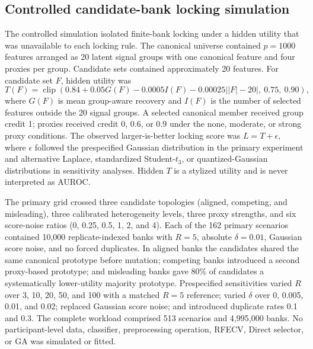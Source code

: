 \subsection{Controlled candidate-bank locking simulation}

The controlled simulation isolated finite-bank locking under a hidden utility that was unavailable to each locking rule. The canonical universe contained $p=1000$ features arranged as 20 latent signal groups with one canonical feature and four proxies per group. Candidate sets contained approximately 20 features. For candidate set $F$, hidden utility was
\begin{equation}
T(F)=\operatorname{clip}\left(0.84+0.05G(F)-0.0005I(F)-0.00025\left||F|-20\right|,\ 0.75,\ 0.90\right),
\end{equation}
where $G(F)$ is mean group-aware recovery and $I(F)$ is the number of selected features outside the 20 signal groups. A selected canonical member received group credit 1; proxies received credit 0, 0.6, or 0.9 under the none, moderate, or strong proxy conditions. The observed larger-is-better locking score was $L=T+\epsilon$, where $\epsilon$ followed the prespecified Gaussian distribution in the primary experiment and alternative Laplace, standardized Student-$t_3$, or quantized-Gaussian distributions in sensitivity analyses. Hidden $T$ is a stylized utility and is never interpreted as AUROC.

The primary grid crossed three candidate topologies (aligned, competing, and misleading), three calibrated heterogeneity levels, three proxy strengths, and six score-noise ratios (0, 0.25, 0.5, 1, 2, and 4). Each of the 162 primary scenarios contained 10,000 replicate-indexed banks with $R=5$, absolute $\delta=0.01$, Gaussian score noise, and no forced duplicates. In aligned banks the candidates shared the same canonical prototype before mutation; competing banks introduced a second proxy-based prototype; and misleading banks gave 80\% of candidates a systematically lower-utility majority prototype. Prespecified sensitivities varied $R$ over 3, 10, 20, 50, and 100 with a matched $R=5$ reference; varied $\delta$ over 0, 0.005, 0.01, and 0.02; replaced Gaussian score noise; and introduced duplicate rates 0.1 and 0.3. The complete workload comprised 513 scenarios and 4,995,000 banks. No participant-level data, classifier, preprocessing operation, RFECV, Direct selector, or GA was simulated or fitted.

